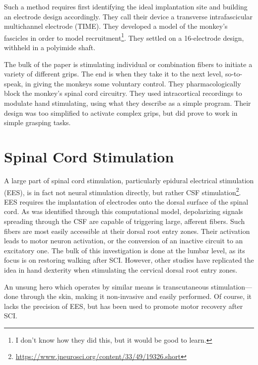 \documentclass[12pt]{report}
\begin{document}
Such a method requires first identifying the ideal implantation site and building an electrode design accordingly. They call their device a transverse intrafascicular multichannel electrode (TIME). They developed a model of the monkey's fascicles in order to model recruitment\footnote{I don't know how they did this, but it would be good to learn.}. They settled on a 16-electrode design, withheld in a polyimide shaft.\newline

The bulk of the paper is stimulating individual or combination fibers to initiate a variety of different grips. The end is when they take it to the next level, so-to-speak, in giving the monkeys some voluntary control. They pharmacologically block the monkey's spinal cord circuitry. They used intracortical recordings to modulate hand stimulating, using what they describe as a simple program. Their design was too simplified to activate complex grips, but did prove to work in simple grasping tasks. 





\chapter{Spinal Cord Stimulation}

\label{sec:SpinalCordStimulation}

A large part of spinal cord stimulation, particularly epidural electrical stimulation (EES), is in fact not neural stimulation directly, but rather CSF stimulation\footnote{\url{https://www.jneurosci.org/content/33/49/19326.short}}. EES requires the implantation of electrodes onto the dorsal surface of the spinal cord. As was identified through this computational model, depolarizing signals spreading through the CSF are capable of triggering large, afferent fibers. Such fibers are most easily accessible at their dorsal root entry zones. Their activation leads to motor neuron activation, or the conversion of an inactive circuit to an excitatory one. The bulk of this investigation is done at the lumbar level, as its focus is on restoring walking after SCI. However, other studies have replicated the idea in hand dexterity when stimulating the cervical dorsal root entry zones.\newline

An unsung hero which operates by similar means is transcutaneous stimulation---done through the skin, making it non-invasive and easily performed. Of course, it lacks the precision of EES, but has been used to promote motor recovery after SCI. 
\end{document}

